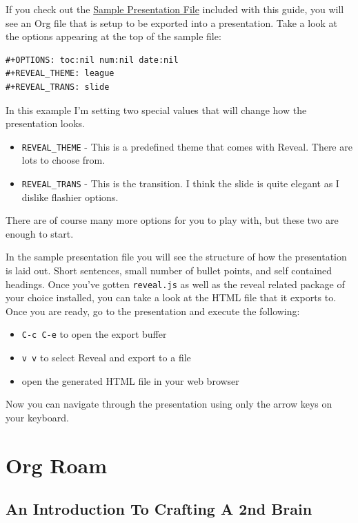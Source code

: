 \documentclass[11pt]{article}
\begin{document}
If you check out the \href{sample-presentation-2.org}{Sample Presentation File} included with this guide, you will see an Org file that is setup to be exported into a presentation. Take a look at the options appearing at the top of the sample file:

\begin{verbatim}
#+OPTIONS: toc:nil num:nil date:nil
#+REVEAL_THEME: league
#+REVEAL_TRANS: slide
\end{verbatim}

In this example I'm setting two special values that will change how the presentation looks.

\begin{itemize}
\item \texttt{REVEAL\_THEME} - This is a predefined theme that comes with Reveal. There are lots to choose from.
\item \texttt{REVEAL\_TRANS} - This is the transition. I think the slide is quite elegant as I dislike flashier options.
\end{itemize}

There are of course many more options for you to play with, but these two are enough to start.

In the sample presentation file you will see the structure of how the presentation is laid out. Short sentences, small number of bullet points, and self contained headings. Once you've gotten \texttt{reveal.js} as well as the reveal related package of your choice installed, you can take a look at the HTML file that it exports to. Once you are ready, go to the presentation and execute the following:

\begin{itemize}
\item \texttt{C-c C-e} to open the export buffer
\item \texttt{v v} to select Reveal and export to a file
\item open the generated HTML file in your web browser
\end{itemize}

Now you can navigate through the presentation using only the arrow keys on your keyboard.
\section*{Org Roam}
\label{sec:org08392b5}
\subsection*{An Introduction To Crafting A 2nd Brain}
\label{sec:org096da68}
\end{document}
